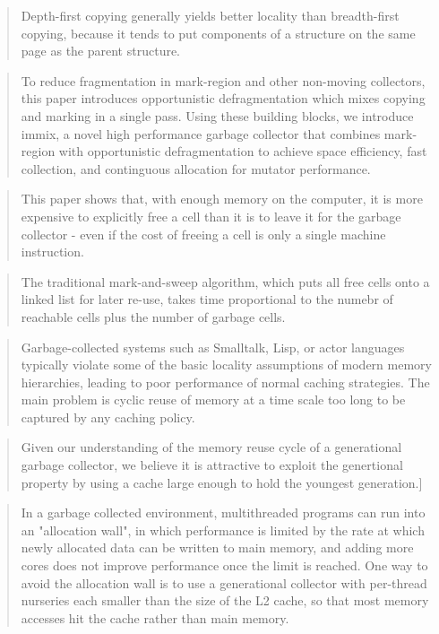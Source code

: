 \documentclass[a4paper,oneside]{memoir}
\begin{document}
\blockquote{Depth-first copying generally yields better locality than
breadth-first copying, because it tends to put components of a structure on the
same page as the parent structure.}
\cite{Moon:1984}

\cite{Blackburn:2004}

\blockquote{To reduce fragmentation in mark-region and other non-moving
collectors, this paper introduces opportunistic defragmentation which mixes
copying and marking in a single pass. Using these building blocks, we introduce
immix, a novel high performance garbage collector that combines mark-region with
opportunistic defragmentation to achieve space efficiency, fast collection, and
continguous allocation for mutator performance.\cite{Blackburn:2008}}

\blockquote{This paper shows that, with enough memory on the computer, it is
more expensive to explicitly free a cell than it is to leave it for the garbage
collector - even if the cost of freeing a cell is only a single machine
instruction.}
\cite{Appel:1987}

\blockquote{The traditional mark-and-sweep algorithm, which puts all free cells
onto a linked list for later re-use, takes time proportional to the numebr of
reachable cells plus the number of garbage cells.}
\cite{Appel:1987}

\blockquote{Garbage-collected systems such as Smalltalk, Lisp, or actor languages typically violate some of the basic locality assumptions of modern memory hierarchies, leading to poor performance of normal caching strategies. The main problem is cyclic reuse of memory at a time scale too long to be captured by any caching policy. \cite{Lam:1992}}


\blockquote{Given our understanding of the memory reuse cycle of a generational
garbage collector, we believe it is attractive to exploit the genertional
property by using a cache large enough to hold the youngest generation.]}
\cite{Lam:1992}

\blockquote{In a garbage collected environment, multithreaded programs can run
into an "allocation wall", in which performance is limited by the rate at which
newly allocated data can be written to main memory, and adding more cores does
not improve performance once the limit is reached. One way to avoid the
allocation wall is to use a generational collector with per-thread nurseries
each smaller than the size of the L2 cache, so that most memory accesses hit the
cache rather than main memory. \cite{Marlow:2011}}
\end{document}
